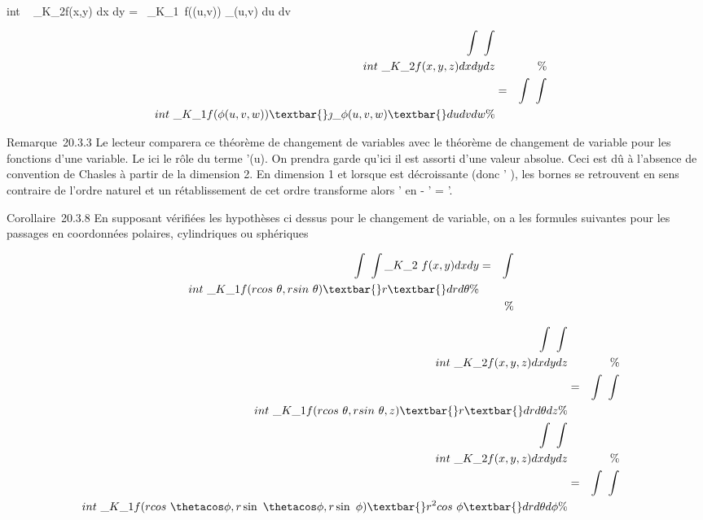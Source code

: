 \documentclass[]{article}
\begin{document}
\int  \\int ~
\_K\_2f(x,y) dx dy =\int ~
\int  \_K\_1~f(\phi(u,v))
\textbar{}\jmath\_\phi(u,v)\textbar{} du dv

\begin{align*} \int ~
\int  \\int ~
\_K\_2f(x,y,z) dx dy dz&& \%&
\\ & =& \int ~
\int  \\int ~
\_K\_1f(\phi(u,v,w)) \textbar{}\jmath\_\phi(u,v,w)\textbar{}
du dv dw\%& \\
\end{align*}

Remarque~20.3.3 Le lecteur comparera ce théorème de changement de
variables avec le théorème de changement de variable pour les fonctions
d'une variable. Le \jmathacobien \jmathoue ici le rôle du terme \phi'(u). On prendra
garde qu'ici il est assorti d'une valeur absolue. Ceci est dû à
l'absence de convention de Chasles à partir de la dimension 2. En
dimension 1 et lorsque \phi est décroissante (donc \phi' ), les bornes se
retrouvent en sens contraire de l'ordre naturel et un rétablissement de
cet ordre transforme alors \phi' en - \phi' = \textbar{}\phi'\textbar{}.

Corollaire~20.3.8 En supposant vérifiées les hypothèses ci dessus pour
le changement de variable, on a les formules suivantes pour les passages
en coordonnées polaires, cylindriques ou sphériques

\begin{align*} \int ~
\int  \_K\_2~f(x,y) dx dy& =&
\int  \\int ~
\_K\_1f(rcos~
\theta,rsin~ \theta) \textbar{}r\textbar{} dr d\theta\%&
\\ & & \%&
\\ \end{align*}

\begin{align*} \int ~
\int  \\int ~
\_K\_2f(x,y,z) dx dy dz&& \%&
\\ & =& \int ~
\int  \\int ~
\_K\_1f(rcos~
\theta,rsin~ \theta,z) \textbar{}r\textbar{} dr d\theta dz
\%& \\ \int ~
\int  \\int ~
\_K\_2f(x,y,z) dx dy dz&& \%&
\\ & =& \int ~
\int  \\int ~
\_K\_1f(rcos~
\thetacos \phi,r\sin~
\thetacos \phi,r\sin~ \phi)
\textbar{}r^2 cos~ \phi\textbar{} dr d\theta
d\phi\%& \\ \end{align*}
\end{document}
